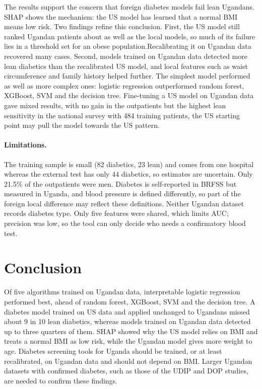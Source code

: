 \documentclass[11pt]{article}
\begin{document}
The results support the concern that foreign diabetes models fail lean Ugandans. SHAP shows the mechanism: the US model has learned that a normal BMI means low risk. Two findings refine this conclusion. First, the US model still ranked Ugandan patients about as well as the local models, so much of its failure lies in a threshold set for an obese population.Recalibrating it on Ugandan data recovered many cases. Second, models trained on Ugandan data detected more lean diabetics than the recalibrated US model, and local features such as waist circumference and family history helped further.
The simplest model performed as well as more complex ones: logistic regression outperformed random forest, XGBoost, SVM and the decision tree. Fine-tuning a US model on Ugandan data gave mixed results, with no gain in the outpatients but the highest lean sensitivity in the national survey with 484 training patients, the US starting point may pull the model towards the US pattern.

\paragraph{Limitations.} The training sample is small (82 diabetics, 23 lean) and comes from one hospital whereas the external test has only 44 diabetics, so estimates are uncertain. 
Only 21.5\% of the outpatients were men. Diabetes is self-reported in BRFSS but measured in Uganda, and blood pressure is defined differently, so part of the foreign local difference may reflect these definitions.
Neither Ugandan dataset records diabetes type. Only five features were shared, which limits AUC; precision was low, so the tool can only decide who needs a confirmatory blood test.

\section{Conclusion}

Of five algorithms trained on Ugandan data, interpretable logistic regression performed best, ahead of random forest, XGBoost, SVM and the decision tree. A diabetes model trained on US data and applied unchanged to Ugandans missed about 9 in 10 lean diabetics, whereas models trained on Ugandan data detected up to three quarters of them. SHAP showed why the US model relies on BMI and treats a normal BMI as low risk, while the Ugandan model gives more weight to age. Diabetes screening tools for Uganda should be trained, or at least recalibrated, on Ugandan data and should not depend on BMI. Larger Ugandan datasets with confirmed diabetes, such as those of the UDIP and DOP studies, are needed to confirm these findings.
\end{document}
